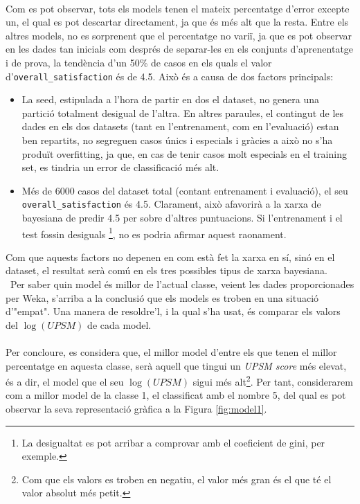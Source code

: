 	\\
	Com es pot observar, tots els models tenen el mateix percentatge d'error excepte un, el qual es pot descartar directament, ja que és més alt que la resta. Entre els altres models, no es sorprenent que el percentatge no variï, ja que es pot observar en les dades tan inicials com després de separar-les en els conjunts d'aprenentatge i de prova,  la tendència d'un 50\% de casos en els quals el valor d'\verb|overall_satisfaction| és de 4.5.
	Això és a causa de dos factors principals:
	\begin{itemize}
		\item La seed, estipulada a l'hora de partir en dos el dataset, no genera una partició totalment desigual de l'altra. En altres paraules, el contingut de les dades en els dos datasets (tant en l'entrenament, com en l'evaluació) estan ben repartits, no segreguen casos únics i especials i gràcies a això no s'ha produït overfitting, ja que, en cas de tenir casos molt especials en el training set, es tindria un error de classificació més alt.
		\item Més de 6000 casos del dataset total (contant entrenament i evaluació), el seu \texttt{overall\_satisfaction} és 4.5. Clarament, això afavorirà a la xarxa de bayesiana de predir 4.5 per sobre d'altres puntuacions. Si l'entrenament i el test fossin desiguals \footnote{La desigualtat es pot arribar a comprovar amb el coeficient de gini, per exemple.}, no es podria afirmar aquest raonament.
	\end{itemize}
Com que aquests factors no depenen en com està fet la xarxa en sí, sinó en el dataset, el resultat serà comú en els tres possibles tipus de xarxa bayesiana.
\\
\
	Per saber quin model és millor de l'actual classe, veient les dades proporcionades per Weka, s'arriba a la conclusió que els models es troben en una situació d'"empat". Una manera de resoldre'l, i la qual s'ha usat, és comparar els valors del $\log(UPSM)$ de cada model.
	\\
	\\
	Per concloure, es considera que, el millor model d'entre els que tenen el millor percentatge en aquesta classe, serà aquell que tingui un \textit{UPSM score} més elevat, és a dir, el model que el seu $\log(UPSM)$ sigui més alt\footnote{Com que els valors es troben en negatiu, el valor més gran és el que té el valor absolut més petit.}. Per tant, considerarem com a millor model de la classe 1, el classificat amb el nombre 5, del qual es pot observar la seva representació gràfica a la Figura \ref{fig:model1}.
	
